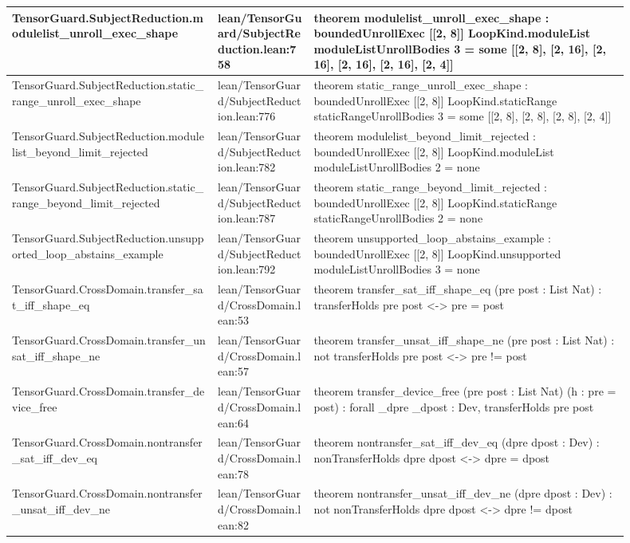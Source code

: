 \documentclass[10pt]{article}
\begin{document}
\begin{longtable}{|p{0.30\linewidth}|p{0.14\linewidth}|p{0.46\linewidth}|}
\hline
TensorGuard.SubjectReduction.modulelist\_unroll\_exec\_shape & lean/TensorGuard/SubjectReduction.lean:758 & theorem modulelist\_unroll\_exec\_shape : boundedUnrollExec [[2, 8]] LoopKind.moduleList moduleListUnrollBodies 3 = some [[2, 8], [2, 16], [2, 16], [2, 16], [2, 16], [2, 4]] \\
\hline
TensorGuard.SubjectReduction.static\_range\_unroll\_exec\_shape & lean/TensorGuard/SubjectReduction.lean:776 & theorem static\_range\_unroll\_exec\_shape : boundedUnrollExec [[2, 8]] LoopKind.staticRange staticRangeUnrollBodies 3 = some [[2, 8], [2, 8], [2, 8], [2, 4]] \\
\hline
TensorGuard.SubjectReduction.modulelist\_beyond\_limit\_rejected & lean/TensorGuard/SubjectReduction.lean:782 & theorem modulelist\_beyond\_limit\_rejected : boundedUnrollExec [[2, 8]] LoopKind.moduleList moduleListUnrollBodies 2 = none \\
\hline
TensorGuard.SubjectReduction.static\_range\_beyond\_limit\_rejected & lean/TensorGuard/SubjectReduction.lean:787 & theorem static\_range\_beyond\_limit\_rejected : boundedUnrollExec [[2, 8]] LoopKind.staticRange staticRangeUnrollBodies 2 = none \\
\hline
TensorGuard.SubjectReduction.unsupported\_loop\_abstains\_example & lean/TensorGuard/SubjectReduction.lean:792 & theorem unsupported\_loop\_abstains\_example : boundedUnrollExec [[2, 8]] LoopKind.unsupported moduleListUnrollBodies 3 = none \\
\hline
TensorGuard.CrossDomain.transfer\_sat\_iff\_shape\_eq & lean/TensorGuard/CrossDomain.lean:53 & theorem transfer\_sat\_iff\_shape\_eq (pre post : List Nat) : transferHolds pre post <-> pre = post \\
\hline
TensorGuard.CrossDomain.transfer\_unsat\_iff\_shape\_ne & lean/TensorGuard/CrossDomain.lean:57 & theorem transfer\_unsat\_iff\_shape\_ne (pre post : List Nat) : not  transferHolds pre post <-> pre != post \\
\hline
TensorGuard.CrossDomain.transfer\_device\_free & lean/TensorGuard/CrossDomain.lean:64 & theorem transfer\_device\_free (pre post : List Nat) (h : pre = post) : forall \_dpre \_dpost : Dev, transferHolds pre post \\
\hline
TensorGuard.CrossDomain.nontransfer\_sat\_iff\_dev\_eq & lean/TensorGuard/CrossDomain.lean:78 & theorem nontransfer\_sat\_iff\_dev\_eq (dpre dpost : Dev) : nonTransferHolds dpre dpost <-> dpre = dpost \\
\hline
TensorGuard.CrossDomain.nontransfer\_unsat\_iff\_dev\_ne & lean/TensorGuard/CrossDomain.lean:82 & theorem nontransfer\_unsat\_iff\_dev\_ne (dpre dpost : Dev) : not  nonTransferHolds dpre dpost <-> dpre != dpost \\

\end{longtable}
\end{document}
